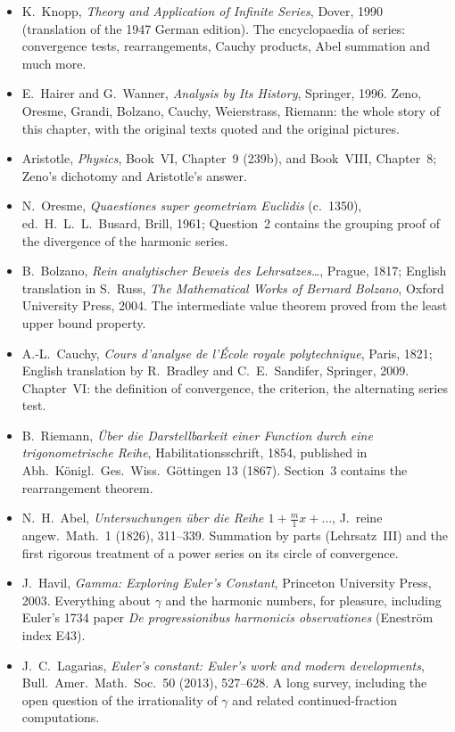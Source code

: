 \begin{itemize}\raggedright
\item K.~Knopp, \emph{Theory and Application of Infinite Series}, Dover, 1990 (translation of the 1947 German edition). The encyclopaedia of series: convergence tests, rearrangements, Cauchy products, Abel summation and much more.
\item E.~Hairer and G.~Wanner, \emph{Analysis by Its History}, Springer, 1996. Zeno, Oresme, Grandi, Bolzano, Cauchy, Weierstrass, Riemann: the whole story of this chapter, with the original texts quoted and the original pictures.
\item Aristotle, \emph{Physics}, Book~VI, Chapter~9 (239b), and Book~VIII, Chapter~8; Zeno's dichotomy and Aristotle's answer.
\item N.~Oresme, \emph{Quaestiones super geometriam Euclidis} (c.~1350), ed.\ H.~L.~L.~Busard, Brill, 1961; Question~2 contains the grouping proof of the divergence of the harmonic series.
\item B.~Bolzano, \emph{Rein analytischer Beweis des Lehrsatzes\dots}, Prague, 1817; English translation in S.~Russ, \emph{The Mathematical Works of Bernard Bolzano}, Oxford University Press, 2004. The intermediate value theorem proved from the least upper bound property.
\item A.-L.~Cauchy, \emph{Cours d'analyse de l'\'Ecole royale polytechnique}, Paris, 1821; English translation by R.~Bradley and C.~E.~Sandifer, Springer, 2009. Chapter~VI: the definition of convergence, the criterion, the alternating series test.
\item B.~Riemann, \emph{\"Uber die Darstellbarkeit einer Function durch eine trigonometrische Reihe}, Habilitationsschrift, 1854, published in Abh.\ K\"onigl.\ Ges.\ Wiss.\ G\"ottingen 13 (1867). Section~3 contains the rearrangement theorem.
\item N.~H.~Abel, \emph{Untersuchungen \"uber die Reihe $1+\frac m1x+\dots$}, J.\ reine angew.\ Math.\ 1 (1826), 311--339. Summation by parts (Lehrsatz~III) and the first rigorous treatment of a power series on its circle of convergence.
\item J.~Havil, \emph{Gamma: Exploring Euler's Constant}, Princeton University Press, 2003. Everything about $\gamma$ and the harmonic numbers, for pleasure, including Euler's 1734 paper \emph{De progressionibus harmonicis observationes} (Eneström index E43).
\item J.~C.~Lagarias, \emph{Euler's constant: Euler's work and modern developments}, Bull.\ Amer.\ Math.\ Soc.\ 50 (2013), 527--628. A long survey, including the open question of the irrationality of $\gamma$ and related continued-fraction computations.

\end{itemize}
